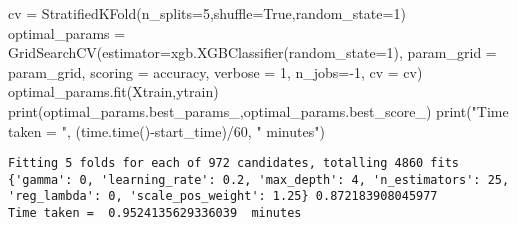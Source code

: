 \documentclass[
  letterpaper,
  DIV=11,
  numbers=noendperiod]{scrreprt}
\newenvironment{Shaded}{\begin{snugshade}}{\end{snugshade}}
\newcommand{\BuiltInTok}[1]{\textcolor[rgb]{0.00,0.23,0.31}{#1}}
\newcommand{\DecValTok}[1]{\textcolor[rgb]{0.68,0.00,0.00}{#1}}
\newcommand{\NormalTok}[1]{\textcolor[rgb]{0.00,0.23,0.31}{#1}}
\newcommand{\OperatorTok}[1]{\textcolor[rgb]{0.37,0.37,0.37}{#1}}
\newcommand{\StringTok}[1]{\textcolor[rgb]{0.13,0.47,0.30}{#1}}
\newcommand{\VariableTok}[1]{\textcolor[rgb]{0.07,0.07,0.07}{#1}}
\begin{document}
\begin{Shaded}
\begin{Highlighting}[]
\NormalTok{cv }\OperatorTok{=}\NormalTok{ StratifiedKFold(n\_splits}\OperatorTok{=}\DecValTok{5}\NormalTok{,shuffle}\OperatorTok{=}\VariableTok{True}\NormalTok{,random\_state}\OperatorTok{=}\DecValTok{1}\NormalTok{)}
\NormalTok{optimal\_params }\OperatorTok{=}\NormalTok{ GridSearchCV(estimator}\OperatorTok{=}\NormalTok{xgb.XGBClassifier(random\_state}\OperatorTok{=}\DecValTok{1}\NormalTok{),}
\NormalTok{                             param\_grid }\OperatorTok{=}\NormalTok{ param\_grid,}
\NormalTok{                             scoring }\OperatorTok{=} \StringTok{\textquotesingle{}accuracy\textquotesingle{}}\NormalTok{,}
\NormalTok{                             verbose }\OperatorTok{=} \DecValTok{1}\NormalTok{,}
\NormalTok{                             n\_jobs}\OperatorTok{={-}}\DecValTok{1}\NormalTok{,}
\NormalTok{                             cv }\OperatorTok{=}\NormalTok{ cv)}
\NormalTok{optimal\_params.fit(Xtrain,ytrain)}
\BuiltInTok{print}\NormalTok{(optimal\_params.best\_params\_,optimal\_params.best\_score\_)}
\BuiltInTok{print}\NormalTok{(}\StringTok{"Time taken = "}\NormalTok{, (time.time()}\OperatorTok{{-}}\NormalTok{start\_time)}\OperatorTok{/}\DecValTok{60}\NormalTok{, }\StringTok{" minutes"}\NormalTok{)}
\end{Highlighting}
\end{Shaded}

\begin{verbatim}
Fitting 5 folds for each of 972 candidates, totalling 4860 fits
{'gamma': 0, 'learning_rate': 0.2, 'max_depth': 4, 'n_estimators': 25, 'reg_lambda': 0, 'scale_pos_weight': 1.25} 0.872183908045977
Time taken =  0.9524135629336039  minutes
\end{verbatim}
\end{document}
